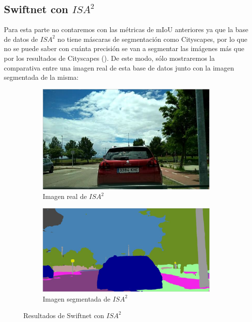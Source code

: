 \subsection{Swiftnet con $ISA^{2}$}

Para esta parte no contaremos con las métricas de \ac{mIoU} anteriores ya que la base de datos de $ISA^{2}$ no tiene máscaras de segmentación como Cityscapes, por lo que no se puede saber con cuánta precisión se van a segmentar las imágenes más que por los resultados de Cityscapes (\cite{swiftnet}). De este modo, sólo mostraremos la comparativa entre una imagen real de esta base de datos junto con la imagen segmentada de la misma:

\begin{figure}[H]
\centering
  \begin{subfigure}[b]{0.45\linewidth}
    \includegraphics[width=\linewidth]{Figuras/Imagen_ISA2_Real.eps}
    \caption{Imagen real de $ISA^{2}$}
  \end{subfigure}
    \begin{subfigure}[b]{0.45\linewidth}
    \includegraphics[width=\linewidth]{Figuras/Imagen_ISA2_Segmentada.eps}
    \caption{Imagen segmentada de $ISA^{2}$}
  \end{subfigure}
  \caption{Resultados de Swiftnet con $ISA^{2}$}
\end{figure}

